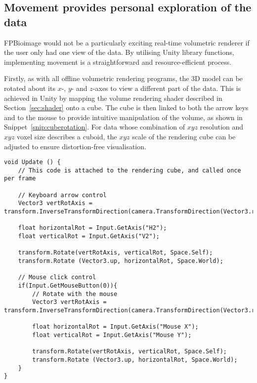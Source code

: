 \subsection{Movement provides personal exploration of the data}
FPBioimage would not be a particularly exciting real-time volumetric renderer if the user only had one view of the data.
By utilising Unity library functions, implementing movement is a straightforward and resource-efficient process.

Firstly, as with all offline volumetric rendering programs, the 3D model can be rotated about its $x$-, $y$- and $z$-axes to view a different part of the data.
This is achieved in Unity by mapping the volume rendering shader described in Section~\ref{sec:shader} onto a cube.
The cube is then linked to both the arrow keys and to the mouse to provide intuitive manipulation of the volume, as shown in Snippet~\ref{snip:cuberotation}.
For data whose combination of $xyz$ resolution and $xyz$ voxel size describes a cuboid, the $xyz$ scale of the rendering cube can be adjusted to ensure distortion-free visualisation.

\begin{lstfloat}
\begin{lstlisting}[language={[Sharp]c}, label={snip:cuberotation}, caption={C\# code using built-in Unity functions for rotating the volumetric data}]
void Update () {
	// This code is attached to the rendering cube, and called once per frame

	// Keyboard arrow control
	Vector3 vertRotAxis = transform.InverseTransformDirection(camera.TransformDirection(Vector3.right)).normalized;

	float horizontalRot = Input.GetAxis("H2");
	float verticalRot = Input.GetAxis("V2");

	transform.Rotate(vertRotAxis, verticalRot, Space.Self);
	transform.Rotate (Vector3.up, horizontalRot, Space.World);

	// Mouse click control
	if(Input.GetMouseButton(0)){
		// Rotate with the mouse
		Vector3 vertRotAxis = transform.InverseTransformDirection(camera.TransformDirection(Vector3.right)).normalized;

		float horizontalRot = Input.GetAxis("Mouse X");
		float verticalRot = Input.GetAxis("Mouse Y");

		transform.Rotate(vertRotAxis, verticalRot, Space.Self);
		transform.Rotate (Vector3.up, horizontalRot, Space.World);
	}
}
\end{lstlisting}
\end{lstfloat}

